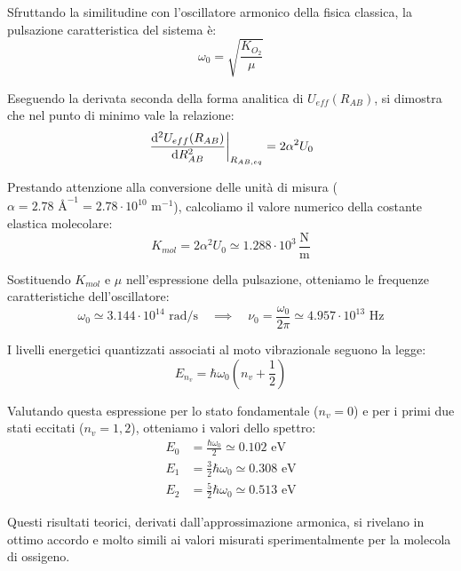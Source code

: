 \begin{exercise}
\begin{solution}
    Sfruttando la similitudine con l'oscillatore armonico della fisica classica, la pulsazione caratteristica del sistema è:
    \begin{equation}
        \omega_0 = \sqrt{\frac{K_{O_2}}{\mu}}
    \end{equation}

    Eseguendo la derivata seconda della forma analitica di \( U_{eff}(R_{AB}) \), si dimostra che nel punto di minimo vale la relazione:
    \begin{equation}
        \left. \dv[2]{U_{eff}(R_{AB})}{R_{AB}} \right|_{R_{AB,eq}} = 2\alpha^2 U_0
    \end{equation}

    Prestando attenzione alla conversione delle unità di misura (\( \alpha = 2.78 \text{ \AA}^{-1} = 2.78 \cdot 10^{10} \text{ m}^{-1} \)), calcoliamo il valore numerico della costante elastica molecolare:
    \begin{equation}
        K_{mol} = 2\alpha^2 U_0 \simeq 1.288 \cdot 10^3 \,\frac{\text{N}}{\text{m}}
    \end{equation}

    Sostituendo \( K_{mol} \) e \( \mu \) nell'espressione della pulsazione, otteniamo le frequenze caratteristiche dell'oscillatore:
    \begin{equation}
        \omega_0 \simeq 3.144 \cdot 10^{14} \text{ rad/s} \quad \implies \quad \nu_0 = \frac{\omega_0}{2\pi} \simeq 4.957 \cdot 10^{13} \text{ Hz}
    \end{equation}

    I livelli energetici quantizzati associati al moto vibrazionale seguono la legge:
    \begin{equation}
        E_{n_v} = \hbar\omega_0 \left( n_v + \frac{1}{2} \right)
    \end{equation}

    Valutando questa espressione per lo stato fondamentale (\( n_v = 0 \)) e per i primi due stati eccitati (\( n_v = 1, 2 \)), otteniamo i valori dello spettro:
    \begin{align}
        E_0 &= \frac{\hbar\omega_0}{2} \simeq 0.102 \text{ eV} \\
        E_1 &= \frac{3}{2}\hbar\omega_0 \simeq 0.308 \text{ eV} \\
        E_2 &= \frac{5}{2}\hbar\omega_0 \simeq 0.513 \text{ eV}
    \end{align}
    
    Questi risultati teorici, derivati dall'approssimazione armonica, si rivelano in ottimo accordo e molto simili ai valori misurati sperimentalmente per la molecola di ossigeno.
\end{solution}
\end{exercise}

